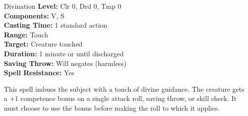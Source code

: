 {Divination}
{
	\textbf{Level:}
	Clr 0, Drd 0, Tmp 0\\
	\textbf{Components:}
	V, S\\
	\textbf{Casting Time:}
	1 standard action\\
	\textbf{Range:}
	Touch\\
	\textbf{Target:}
	Creature touched\\
	\textbf{Duration:}
	1 minute or until discharged\\
	\textbf{Saving Throw:}
	Will negates (harmless)\\
	\textbf{Spell Resistance:}
	Yes\\
}
{
	This spell imbues the subject with a touch of divine guidance. The creature gets a +1 competence bonus on a single attack roll, saving throw, or skill check. It must choose to use the bonus before making the roll to which it applies.

}
